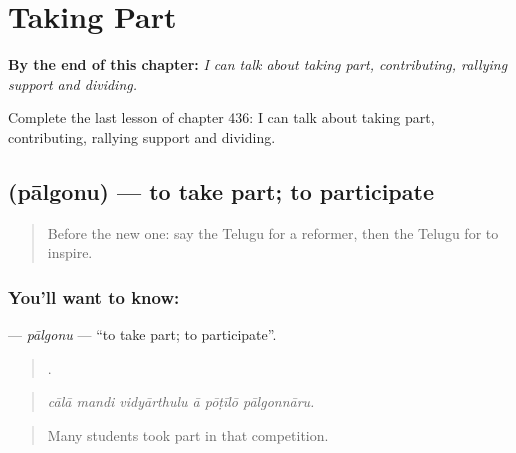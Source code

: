 
\chapter{Taking Part}
\label{ch:te-taking-part}

\begin{chapteropening}
\textbf{By the end of this chapter:} \emph{I can talk about taking part, contributing, rallying support and dividing.}

Complete the last lesson of chapter 436: I can talk about taking part, contributing, rallying support and dividing.
\end{chapteropening}

\section[\texorpdfstring{\te{పాల్గొను} (pālgonu)}{పాల్గొను (pālgonu)}]{ (pālgonu) — to take part; to participate}

\label{lesson:TE-C436-palgonu}



\begin{quote}
Before the new one: say the Telugu for a reformer, then the Telugu for to inspire.
\end{quote}

\subsection*{You'll want to know: }
\textbf{} — \emph{pālgonu} — \textquotedblleft{}to take part; to participate\textquotedblright{}.

\begin{quote}
     .
\end{quote}

\begin{quote}
\emph{cālā mandi vidyārthulu ā pōṭīlō pālgonnāru.}
\end{quote}

\begin{quote}
Many students took part in that competition.
\end{quote}

